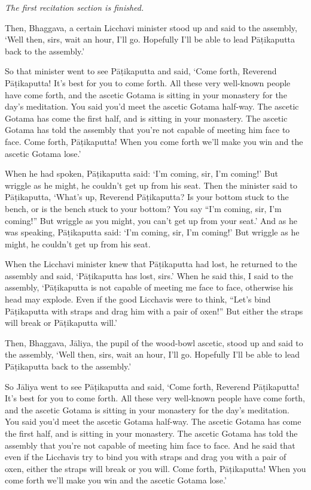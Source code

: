 \documentclass[12pt,openany]{book}%
\newcommand*{\scendsection}[1]{\begin{Center}\begin{small}\textit{#1}\end{small}\end{Center}\addvspace{1em}}
\begin{document}
\scendsection{The first recitation section is finished. }

Then, Bhaggava, a certain Licchavi minister stood up and said to the assembly, ‘Well then, sirs, wait an hour, I’ll go. Hopefully I’ll be able to lead \textsanskrit{Pāṭikaputta} back to the assembly.’ 

So that minister went to see \textsanskrit{Pāṭikaputta} and said, ‘Come forth, Reverend \textsanskrit{Pāṭikaputta}! It’s best for you to come forth. All these very well-known people have come forth, and the ascetic Gotama is sitting in your monastery for the day’s meditation. You said you’d meet the ascetic Gotama half-way. The ascetic Gotama has come the first half, and is sitting in your monastery. The ascetic Gotama has told the assembly that you’re not capable of meeting him face to face. Come forth, \textsanskrit{Pāṭikaputta}! When you come forth we’ll make you win and the ascetic Gotama lose.’ 

When he had spoken, \textsanskrit{Pāṭikaputta} said: ‘I’m coming, sir, I’m coming!’ But wriggle as he might, he couldn’t get up from his seat. Then the minister said to \textsanskrit{Pāṭikaputta}, ‘What’s up, Reverend \textsanskrit{Pāṭikaputta}? Is your bottom stuck to the bench, or is the bench stuck to your bottom? You say “I’m coming, sir, I’m coming!” But wriggle as you might, you can’t get up from your seat.’ And as he was speaking, \textsanskrit{Pāṭikaputta} said: ‘I’m coming, sir, I’m coming!’ But wriggle as he might, he couldn’t get up from his seat. 

When the Licchavi minister knew that \textsanskrit{Pāṭikaputta} had lost, he returned to the assembly and said, ‘\textsanskrit{Pāṭikaputta} has lost, sirs.’ When he said this, I said to the assembly, ‘\textsanskrit{Pāṭikaputta} is not capable of meeting me face to face, otherwise his head may explode. Even if the good Licchavis were to think, “Let’s bind \textsanskrit{Pāṭikaputta} with straps and drag him with a pair of oxen!” But either the straps will break or \textsanskrit{Pāṭikaputta} will.’ 

Then, Bhaggava, \textsanskrit{Jāliya}, the pupil of the wood-bowl ascetic, stood up and said to the assembly, ‘Well then, sirs, wait an hour, I’ll go. Hopefully I’ll be able to lead \textsanskrit{Pāṭikaputta} back to the assembly.’ 

So \textsanskrit{Jāliya} went to see \textsanskrit{Pāṭikaputta} and said, ‘Come forth, Reverend \textsanskrit{Pāṭikaputta}! It’s best for you to come forth. All these very well-known people have come forth, and the ascetic Gotama is sitting in your monastery for the day’s meditation. You said you’d meet the ascetic Gotama half-way. The ascetic Gotama has come the first half, and is sitting in your monastery. The ascetic Gotama has told the assembly that you’re not capable of meeting him face to face. And he said that even if the Licchavis try to bind you with straps and drag you with a pair of oxen, either the straps will break or you will. Come forth, \textsanskrit{Pāṭikaputta}! When you come forth we’ll make you win and the ascetic Gotama lose.’ 
\end{document}
